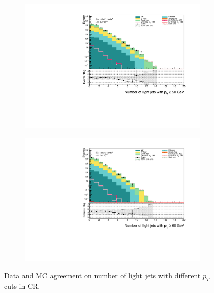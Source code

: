 \documentclass[12pt, a4paper]{book}
\begin{document}
\begin{figure}[!ht]
\begin{subfigure}[b]{0.49\textwidth}
    \end{subfigure}
    \hfill\begin{subfigure}[b]{0.49\textwidth}
        \centering
        \includegraphics[width=\textwidth]{ljetsPt50.pdf}
    \end{subfigure}
    \hfill\begin{subfigure}[b]{0.49\textwidth}
        \centering
        \includegraphics[width=\textwidth]{ljetsPt60.pdf}
    \end{subfigure}
    \caption{Data and MC agreement on number of light jets with different $p_T$ cuts in CR.}
\end{figure}
\end{document}
